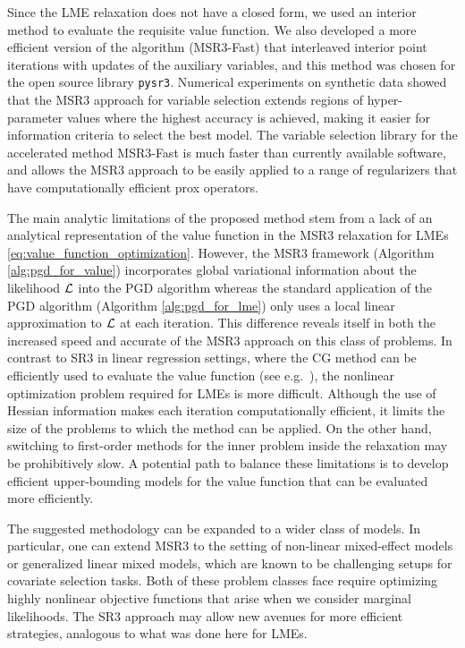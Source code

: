     Since the LME relaxation does not have a closed form, we used an interior method to evaluate the requisite value function. We also developed 
    a more efficient version of the algorithm  (MSR3-Fast) that interleaved interior point iterations with updates of the auxiliary variables, and this method was chosen for the 
    open source library \texttt{pysr3}. %
{ Numerical experiments on synthetic data showed that the MSR3 approach for variable selection extends regions of hyper-parameter values where the highest accuracy is achieved, making it easier for information criteria to select the best model.} 
 The variable selection library for the accelerated method MSR3-Fast is much faster than currently available software, and allows the MSR3 approach to be easily applied to a range of regularizers that have 
{computationally efficient prox operators.} %

    The main analytic limitations of the proposed method stem from a lack of an analytical representation of the value function in the MSR3 relaxation for LMEs
    \eqref{eq:value_function_optimization}. 
    However, the MSR3 framework (Algorithm \ref{alg:pgd_for_value})
    incorporates global variational information about
    the likelihood $\operatorname{\mathcal{L}}$ into the PGD algorithm whereas the standard application of the PGD algorithm (Algorithm \ref{alg:pgd_for_lme}) only uses a local linear approximation to
    $\operatorname{\mathcal{L}}$ at each iteration. This difference reveals itself in both the increased speed and accurate of the MSR3 approach on this class of problems.
{In contrast to SR3 in linear regression settings, where the CG method can be efficiently used to evaluate the value function (see e.g.~\cite{Baraldi2019}),  
 the nonlinear optimization problem required for LMEs is more difficult.} 
{Although the use of
Hessian information makes each iteration computationally efficient, it limits the size of the problems to which the method can be applied. 
On the other hand, switching to first-order methods for the inner problem inside the relaxation may be prohibitively slow. 
A potential path to balance these limitations is to develop efficient upper-bounding models for the value function that can be evaluated more efficiently.
}
    
    The suggested methodology can be expanded to a wider class of models. In particular, one can extend MSR3 to the setting of non-linear mixed-effect models or generalized linear mixed models, which are known to be challenging setups for covariate selection tasks. Both of these problem classes face require optimizing highly nonlinear objective functions that arise when we consider marginal likelihoods. 
The SR3  approach may allow new avenues for more efficient strategies, analogous to what was done here for LMEs. 

